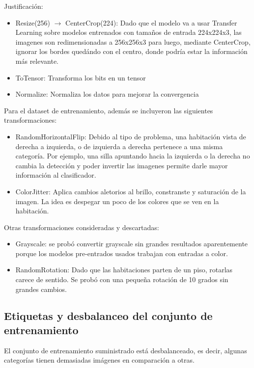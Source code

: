\documentclass{article}[9pt]
\begin{document}
Justificación: 

\begin{itemize}
  \item Resize(256) $\rightarrow$ CenterCrop(224): Dado que el modelo va a usar Transfer Learning sobre modelos entrenados con tamaños de entrada 224x224x3, las imagenes son redimensionadas a 256x256x3 para luego, mediante CenterCrop, ignorar los bordes quedándo con el centro, donde podría estar la información más relevante. 
  \item ToTensor: Transforma los bits en un tensor
  \item Normalize: Normaliza los datos para mejorar la convergencia  
\end{itemize}

Para el dataset de entrenamiento, además se incluyeron las siguientes transformaciones:

\begin{itemize}
  \item RandomHorizontalFlip: Debido al tipo de problema, una habitación vista de derecha a izquierda, o de izquierda a derecha pertenece a una misma categoría. Por ejemplo, una silla apuntando hacia la izquierda o la derecha no cambia la detección y poder invertir las imagenes permite darle mayor información al clasificador. 
  \item ColorJitter: Aplica cambios aletorios al brillo, constranste y saturación de la imagen. La idea es despegar un poco de los colores que se ven en la habitación. 
\end{itemize}

Otras transformaciones consideradas y descartadas: 

\begin{itemize}
  \item Grayscale: se probó convertir grayscale sin grandes resultados aparentemente porque los modelos pre-entrados usados trabajan con entradas a color. 
  \item RandomRotation: Dado que las habitaciones parten de un piso, rotarlas carece de sentido. Se probó con una pequeña rotación de 10 grados sin grandes cambios.
\end{itemize}

\subsection{Etiquetas y desbalanceo del conjunto de entrenamiento}

El conjunto de entrenamiento suministrado está desbalanceado, es decir, algunas categorías tienen demasiadas imágenes en comparación a otras. 
\end{document}
